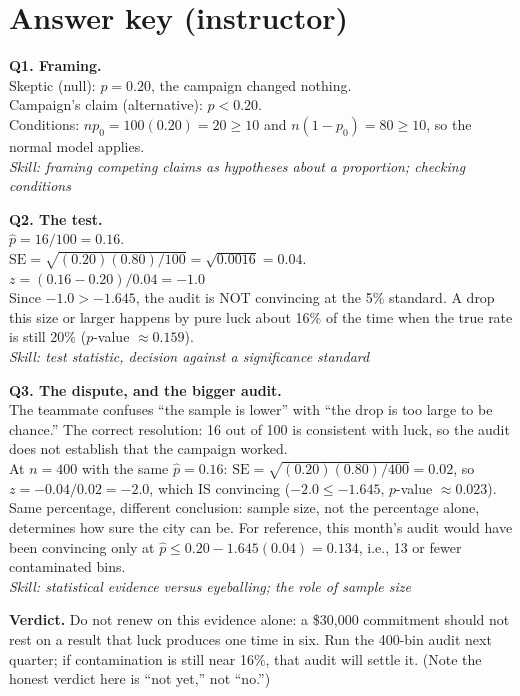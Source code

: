 \documentclass[11pt]{article}
\newcommand{\skill}[1]{{\small\textit{Skill: #1}}\par}
\begin{document}
\section*{Answer key (instructor)}
\begin{keybox}
\textbf{Q1. Framing.}\\
Skeptic (null): $p = 0.20$, the campaign changed nothing.\\
Campaign's claim (alternative): $p < 0.20$.\\
Conditions: $np_0 = 100(0.20) = 20 \ge 10$ and $n(1-p_0) = 80 \ge 10$, so the normal model applies.\\
\skill{framing competing claims as hypotheses about a proportion; checking conditions}

\medskip
\textbf{Q2. The test.}\\
$\hat{p} = 16/100 = 0.16$.\\
$\text{SE} = \sqrt{(0.20)(0.80)/100} = \sqrt{0.0016} = 0.04$.\\
$z = (0.16 - 0.20)/0.04 = \boxed{-1.0}$\\
Since $-1.0 > -1.645$, the audit is NOT convincing at the 5\% standard. A drop this size or larger happens by pure luck about 16\% of the time when the true rate is still 20\% ($p$-value $\approx 0.159$).\\
\skill{test statistic, decision against a significance standard}

\medskip
\textbf{Q3. The dispute, and the bigger audit.}\\
The teammate confuses ``the sample is lower'' with ``the drop is too large to be chance.'' The correct resolution: 16 out of 100 is consistent with luck, so the audit does not establish that the campaign worked.\\
At $n = 400$ with the same $\hat{p} = 0.16$: $\text{SE} = \sqrt{(0.20)(0.80)/400} = 0.02$, so $z = -0.04/0.02 = \boxed{-2.0}$, which IS convincing ($-2.0 \le -1.645$, $p$-value $\approx 0.023$).\\
Same percentage, different conclusion: sample size, not the percentage alone, determines how sure the city can be. For reference, this month's audit would have been convincing only at $\hat{p} \le 0.20 - 1.645(0.04) = 0.134$, i.e., 13 or fewer contaminated bins.\\
\skill{statistical evidence versus eyeballing; the role of sample size}

\medskip
\textbf{Verdict.} Do not renew on this evidence alone: a \$30{,}000 commitment should not rest on a result that luck produces one time in six. Run the 400-bin audit next quarter; if contamination is still near 16\%, that audit will settle it. (Note the honest verdict here is ``not yet,'' not ``no.'')
\end{keybox}
\end{document}
